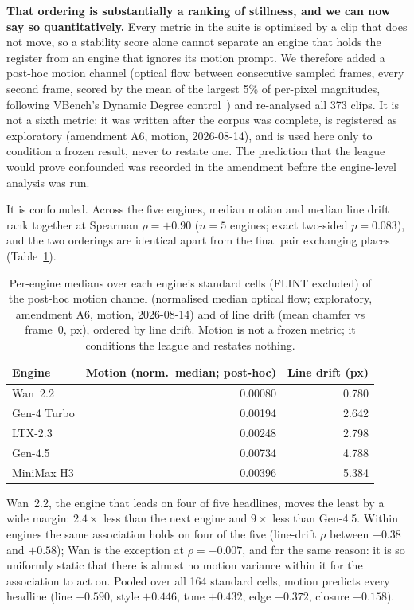 \documentclass[11pt]{article}
\begin{document}
\textbf{That ordering is substantially a ranking of stillness, and we can now
say so quantitatively.} Every metric in the suite is optimised by a clip that
does not move, so a stability score alone cannot separate an engine that holds
the register from an engine that ignores its motion prompt. We therefore added
a post-hoc motion channel (optical flow between consecutive sampled frames,
every second frame, scored
by the mean of the largest 5\% of per-pixel magnitudes, following VBench's
Dynamic Degree control~\cite{huang2023vbench}) and re-analysed all 373
clips. It is not a sixth metric: it was written after the corpus was complete,
is registered as exploratory (amendment A6, motion, 2026-08-14), and is used here only to condition
a frozen result, never to restate one. The prediction that the league would
prove confounded was recorded in the amendment before the engine-level
analysis was run.

It is confounded. Across the five engines, median motion and median line drift
rank together at Spearman $\rho = +0.90$ ($n = 5$ engines; exact two-sided
$p = 0.083$), and the two orderings are identical apart from the final pair
exchanging places (Table~\ref{tab:motion}).

\begin{table}[h]
\centering
\small
\begin{tabular}{lrr}
\toprule
Engine & Motion (norm.\ median; post-hoc) & Line drift (px) \\
\midrule
Wan~2.2      & 0.00080 & 0.780 \\
Gen-4 Turbo  & 0.00194 & 2.642 \\
LTX-2.3      & 0.00248 & 2.798 \\
Gen-4.5      & 0.00734 & 4.788 \\
MiniMax H3   & 0.00396 & 5.384 \\
\bottomrule
\end{tabular}
\caption{Per-engine medians over each engine's standard cells (FLINT
excluded) of the post-hoc motion channel (normalised median optical flow;
exploratory, amendment A6, motion, 2026-08-14) and of line drift (mean
chamfer vs frame~0, px), ordered by line drift. Motion is not a frozen
metric; it conditions the league and restates nothing.}
\label{tab:motion}
\end{table}

Wan~2.2, the engine that leads on four of five headlines, moves the least by a
wide margin: $2.4\times$ less than the next engine and $9\times$ less than
Gen-4.5. Within engines the same association holds on four of the five
(line-drift $\rho$ between $+0.38$ and $+0.58$); Wan is the exception at
$\rho = -0.007$, and for the same reason: it is so uniformly static that
there is almost no motion variance within it for the association to act on.
Pooled over all 164 standard cells, motion predicts every headline
(line $+0.590$, style $+0.446$, tone $+0.432$, edge $+0.372$, closure
$+0.158$).
\end{document}
